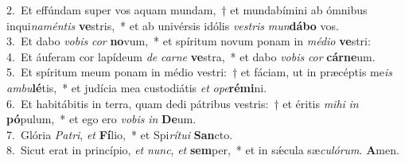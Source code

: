 {2.~}Et effúndam super vos aquam mundam,~† et mundabímini ab ómnibus inqui\textit{na}\textit{mén}\textit{tis} \textbf{ve}stris,~* et ab univérsis idólis \textit{ve}\textit{stris} \textit{mun}\textbf{dá}\textbf{bo} vos.\\
{3.~}Et dabo \textit{vo}\textit{bis} \textit{cor} \textbf{no}vum,~* et spíritum novum ponam in \textit{mé}\textit{di}\textit{o} \textbf{ve}stri:\\
{4.~}Et áuferam cor lapídeum \textit{de} \textit{car}\textit{ne} \textbf{ve}stra,~* et dabo \textit{vo}\textit{bis} \textit{cor} \textbf{cár}\textbf{ne}um.\\
{5.~}Et spíritum meum ponam in médio vestri:~† et fáciam, ut in præcéptis me\textit{is} \textit{am}\textit{bu}\textbf{lé}tis,~* et judícia mea custodiátis \textit{et} \textit{o}\textit{pe}\textbf{ré}\textbf{mi}ni.\\
{6.~}Et habitábitis in terra, quam dedi pátribus vestris:~† et éritis \textit{mi}\textit{hi} \textit{in} \textbf{pó}pulum,~* et ego ero \textit{vo}\textit{bis} \textit{in} \textbf{De}um.\\
{7.~}Glória \textit{Pa}\textit{tri}, \textit{et} \textbf{Fí}lio,~* et Spi\textit{rí}\textit{tu}\textit{i} \textbf{San}cto.\\
{8.~}Sicut erat in princípio, \textit{et} \textit{nunc}, \textit{et} \textbf{sem}per,~* et in sǽcula sæ\textit{cu}\textit{ló}\textit{rum}. \textbf{A}men.\\

